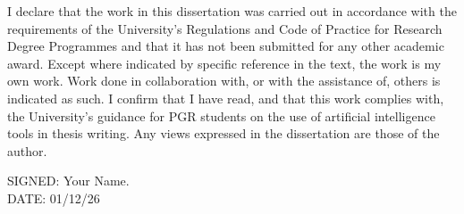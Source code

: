 \cleardoublepage
{}
\pagestyle{plain} 
\begin{declaration}

I declare that the work in this dissertation was carried out in accordance with the requirements of the University's Regulations and Code of Practice for Research Degree Programmes and that it has not been submitted for any other academic award. Except where indicated by specific reference in the text, the work is my own work. Work done in collaboration with, or with the assistance of, others is indicated as such. I confirm that I have read, and that this work complies with, the University’s guidance for PGR students on the use of artificial intelligence tools in thesis writing. Any views expressed in the dissertation are those of the author.

\par\vspace*{3cm}\par

\noindent SIGNED: Your Name. \\ 
DATE: 01/12/26


\end{declaration}

